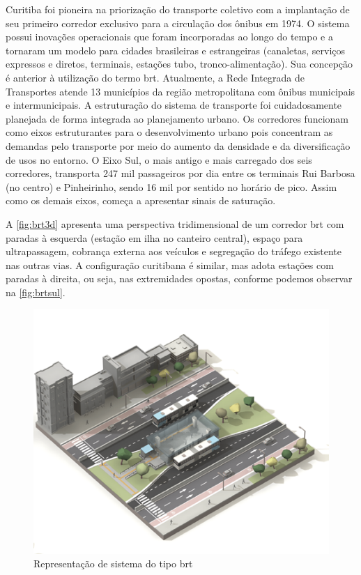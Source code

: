 	\begin{citacao}
		Curitiba foi pioneira na priorização do transporte coletivo com a implantação de seu primeiro corredor exclusivo para a circulação dos ônibus em 1974. O sistema possui inovações operacionais que foram incorporadas ao longo do tempo e a tornaram um modelo para cidades brasileiras e estrangeiras (canaletas, serviços expressos e diretos, terminais, estações tubo, tronco-alimentação). Sua concepção é anterior à utilização do termo \gls{brt}. Atualmente, a Rede Integrada de Transportes atende 13 municípios da região metropolitana com ônibus municipais e intermunicipais. A estruturação do sistema de transporte foi cuidadosamente planejada de forma integrada ao planejamento urbano. Os corredores funcionam como eixos estruturantes para o desenvolvimento urbano pois concentram as demandas pelo transporte por meio do aumento da densidade e da diversificação de usos no entorno.	O Eixo Sul, o mais antigo e mais carregado dos seis corredores, transporta 247 mil 	passageiros por dia entre os terminais Rui Barbosa (no centro) e Pinheirinho, sendo 16 mil por sentido no horário de pico. Assim como os demais eixos, começa a apresentar sinais de saturação. \cite[p. 42]{guia2015a}
	\end{citacao}

	A \autoref{fig:brt3d} apresenta uma perspectiva tridimensional de um corredor \gls{brt} com paradas à esquerda (estação em ilha no canteiro central), espaço para ultrapassagem, cobrança externa aos veículos e segregação do tráfego existente nas outras vias. A configuração curitibana é similar, mas adota estações com paradas à direita, ou seja, nas extremidades opostas, conforme podemos observar na \autoref{fig:brtsul}.
	
	\begin{figure}
		\centering
		\caption{Representação de sistema do tipo \glsdesc{brt}}
		\label{fig:brt3d}
		\includegraphics[width=0.55\linewidth]{img/guiatpc2018a_01}
	\end{figure}
	
